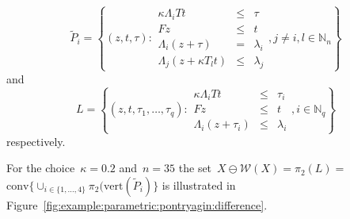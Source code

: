 \documentclass[a4paper, 12pt, twoside]{article}
\theoremstyle{definition}
\numberwithin{equation}{section}
\providecommand{\conv}{\text{conv}}
\begin{document}
$$
\tilde P_i= \left\{(z,t,\tau): \begin{array}{rcl}\kappa\Lambda_i Tt &\leq& \tau\\ Fz&\leq& t\\ \Lambda_i(z+\tau)&=&\lambda_i\\ \Lambda_j(z+\kappa T_lt)&\leq&\lambda_j\end{array},j\neq i,l\in\mathbb N_n\right\}
$$
%
and
$$
L = \left\{(z,t,\tau_1,\dots,\tau_q):\begin{array}{rcl}
\kappa\Lambda_i Tt & \leq &\tau_i\\
Fz &\leq& t\\
\Lambda_i(z+\tau_i)&\leq&\lambda_i
\end{array},i\in\mathbb N_q\right\}
$$
%
respectively.

For the choice~$\kappa=0.2$ and~$n = 35$ the set~$X\ominus\mathcal W(X)=\pi_2(L)=$\linebreak $\conv\{\cup_{i\in\{1,\dots,4\}}\pi_2(\text{vert}(\tilde P_i)\}$ is illustrated in Figure~\ref{fig:example:parametric:pontryagin:difference}.
\end{document}
